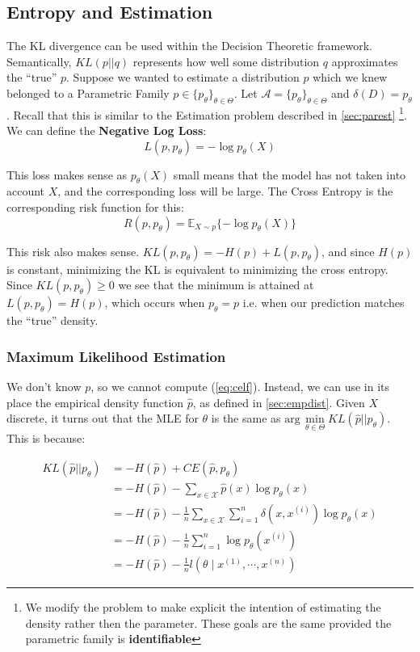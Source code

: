\documentclass[]{article}
\theoremstyle{mattstyle}
\theoremstyle{definition}
\begin{document}
\subsection{Entropy and Estimation}

The KL divergence can be used within the Decision Theoretic framework. Semantically, $KL(p||q)$ represents how well some distribution $q$ approximates the ``true'' $p$. Suppose we wanted to estimate a distribution $p$ which we knew belonged to a Parametric Family  $p\in \{p_{\theta}\}_{\theta\in\Theta}$. Let \(\mathcal{A} = \{p_{\theta}\}_{\theta\in\Theta}\) and $\delta(D)=p_{\theta}$. Recall that this is similar to the Estimation problem described in \ref{sec:parest} \footnote{We modify the problem to make explicit the intention of estimating the density rather then the parameter. These goals are the same provided the parametric family is \textbf{identifiable}}.  We can define the \textbf{Negative Log Loss}:
\begin{equation}
L(p,p_{\theta}) = -\log p_{\theta}(X)
\end{equation}

This loss makes sense as $p_{\theta}(X)$ small means that the model has not taken into account $X$, and the corresponding loss will be large. The Cross Entropy is the corresponding risk function for this:
\begin{equation}\label{eq:celf}
R(p,p_{\theta}) = \mathbb{E}_{X\sim p}\{ -\log p_{\theta}(X) \}
\end{equation}	

This risk also makes sense. $KL(p,p_{\theta}) = -H(p) + L(p,p_{\theta})$, and since $H(p)$ is constant, minimizing the KL is equivalent to minimizing the cross entropy. Since $KL(p,p_{\theta}) \ge 0$ we see that the minimum is attained at $L(p,p_{\theta}) = H(p)$, which occurs when $p_{\theta}=p$ i.e. when our prediction matches the ``true'' density.

\subsubsection{Maximum Likelihood Estimation}

We don't know $p$, so we cannot compute (\ref{eq:celf}). Instead, we can use in its place the empirical density function $\hat{p}$, as defined in \ref{sec:empdist}. Given $X$ discrete, it turns out that the MLE for $\theta$ is the same as $\text{arg}\,\min\limits_{\theta\in\Theta} KL(\hat{p}||p_{\theta})$. This is because:

\begin{align*}
KL(\hat{p}||p_{\theta}) &= -H(\hat{p}) + CE(\hat{p},p_{\theta}) \\
&= -H(\hat{p}) - \sum_{x\in\mathcal{X}}\hat{p}(x)\log p_{\theta}(x)\\
&= -H(\hat{p}) - \frac{1}{n}\sum_{x\in\mathcal{X}}\sum_{i=1}^n\delta(x,x^{(i)}) \log p_{\theta}(x)\\
&= -H(\hat{p}) - \frac{1}{n}\sum_{i=1}^n\log p_{\theta}(x^{(i)})\\
&= -H(\hat{p}) - \frac{1}{n}l(\theta \mid x^{(1)}, \cdots, x^{(n)})
\end{align*}
\end{document}
